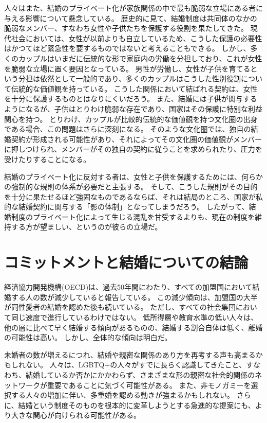 \documentclass[paper=a4,book,openany]{jlreq} \usepackage{mystyle}
\begin{document}
人々はまた、結婚のプライベート化が家族関係の中で最も脆弱な立場にある者に与える影響について懸念している。
歴史的に見て、結婚制度は共同体のなかの脆弱なメンバー、すなわち女性や子供たちを保護する役割を果たしてきた。
現代社会においては、女性が以前よりも自立しているため、こうした保護の必要性はかつてほど緊急性を要するものではないと考えることもできる。
しかし、多くのカップルはいまだに伝統的な形で家庭内の労働を分担しており、これが女性を脆弱な立場に置く要因となっている。
男性が労働し、女性が子供を育てるという分担は依然として一般的であり、多くのカップルはこうした性別役割について伝統的な価値観を持っている。
こうした関係において結ばれる契約は、女性を十分に保護するものとはなりにくいだろう。
また、結婚には子供が関与するようになるが、子供はとりわけ脆弱な存在であり、国家はその保護に特別な利益関心を持つ。
とりわけ、カップルが比較的伝統的な価値観を持つ文化圏の出身である場合、この問題はさらに深刻になる。
そのような文化圏では、独自の結婚契約が形成される可能性があり、それによってその文化圏の価値観がメンバーに押しつけられ、メンバーがその独自の契約に従うことを求められたり、圧力を受けたりすることになる。

結婚のプライベート化に反対する者は、女性と子供を保護するためには、何らかの強制的な規則の体系が必要だと主張する。
そして、こうした規則がその目的を十分に果たせるほど強固なものであるならば、それは結局のところ、国家が私的な結婚契約に関与する「影の体制」となってしまうだろう。
したがって、結婚制度のプライベート化によって生じる混乱を甘受するよりも、現在の制度を維持する方が望ましい、というのが彼らの立場だ\citep[p.204]{hartley12:_polit_liber_marriag_famil}。

\section{コミットメントと結婚についての結論}

経済協力開発機構(OECD)は、過去50年間にわたり、すべての加盟国において結婚する人の数が減少していると報告している\citep{oecd22:_marriag_divor_rates}。
この減少傾向は、加盟国の大半が同性愛者の結婚を認めた後も続いている。
ただし、すべての社会集団において同じ速度で進行しているわけではない。
低所得層や教育水準の低い人々は、他の層に比べて早く結婚する傾向があるものの、結婚する割合自体は低く、離婚の可能性は高い\citep{lundberg16:_famil_inequal}。
しかし、全体的な傾向は明白だ。

未婚者の数が増えるにつれ、結婚や親密な関係のあり方を再考する声も高まるかもしれない。
人々は、LGBTQ+の人々がすでに長らく認識してきたこと、すなわち、結婚しているか否かにかかわらず、さまざまな形の親密な社会的関係のネットワークが重要であることに気づく可能性がある。
また、非モノガミーを選択する人々の増加に伴い、多重婚を認める動きが強まるかもしれない。
さらに、結婚という制度そのものを根本的に変革しようとする急進的な提案にも、より大きな関心が向けられる可能性がある。
\end{document}
